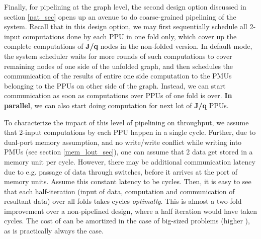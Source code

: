 \documentclass[12pt]{article}
\begin{document}
Finally, for pipelining at the graph level, the second
design option discussed in section \ref{pat_sec} opens up an
avenue to do coarse-grained pipelining of the system. Recall that in this
design option, we may first sequentially schedule all  2-input
computations done by each PPU in one fold only, which cover up
the complete computations of \textbf{J/q} nodes in the non-folded version.
In default mode, the system scheduler waits for  more
rounds of such computations to cover remaining nodes of one side of the
unfolded graph, and then schedules the communication of the results of
entire one side computation to the PMUs belonging to the
PPUs on
other side of the graph. Instead, we can start communication as soon as
 computations over PPUs of one fold is over. \textbf{In parallel}, we can also
start doing computation for next lot of \textbf{J/q}
PPUs.

To characterize the impact of this level of pipelining
on throughput, we assume that
2-input computations by each PPU happen in a
single cycle. Further, due to dual-port memory assumption, and no
write/write conflict while writing into PMUs (see section
\ref{mem_lout_sec}), one can assume that 2 data get stored in a memory
unit per cycle. However, there may be additional communication latency
due to e.g. passage of data through switches, before it arrives at the
port of memory units. Assume this constant latency to be  cycles.
Then, it is easy to see that each half-iteration (input of data, computation
and communication of resultant data) over all folds takes
{\large } cycles
\textit{optimally}. This is almost a two-fold improvement over a
non-pipelined design, where a half iteration would have taken
{\large } cycles. The cost of
 can be amortized in the case of big-sized problems (higher
), as is practically always the case.
\end{document}
